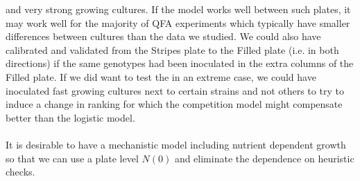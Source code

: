 and very strong growing cultures. If the model works well between such
plates, it may work well for the majority of QFA experiments which
typically have smaller differences between cultures than the data we
studied. We could also have calibrated and validated from the Stripes
plate to the Filled plate (i.e. in both directions) if the same
genotypes had been inoculated in the extra columns of the Filled
plate. If we did want to test the in an extreme case, we could have
inoculated fast growing cultures next to certain strains and not
others to try to induce a change in ranking for which the competition
model might compensate better than the logistic model.
\\\\
It is desirable to have a mechanistic model including nutrient
dependent growth so that we can use a plate level \(N(0)\) and
eliminate the dependence on heuristic checks.






